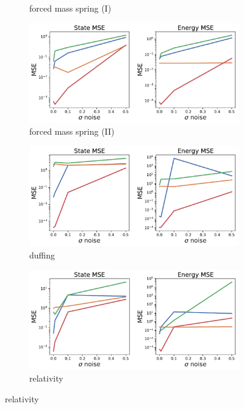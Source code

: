 \documentclass[twoside]{article}
\begin{document}
\begin{figure}[h!]
\begin{subfigure}[b]{0.42\textwidth}
\caption{forced mass spring (I)}
\end{subfigure}
\begin{subfigure}[b]{0.42\textwidth}
\includegraphics[width=\textwidth]{figures/figures/forced_mass_spring/2/forced_mass_spring_noise_scaling.pdf}
\caption{forced mass spring (II)}
\end{subfigure}
\begin{subfigure}[b]{0.42\textwidth}
\includegraphics[width=\textwidth]{figures/figures/duffing/1/duffing_noise_scaling.pdf}
\caption{duffing}
\end{subfigure}
\begin{subfigure}[b]{0.42\textwidth}
\includegraphics[width=\textwidth]{figures/figures/relativity/1/relativity_noise_scaling.pdf}
\caption{relativity}
\end{subfigure}
\end{figure}
\end{document}
